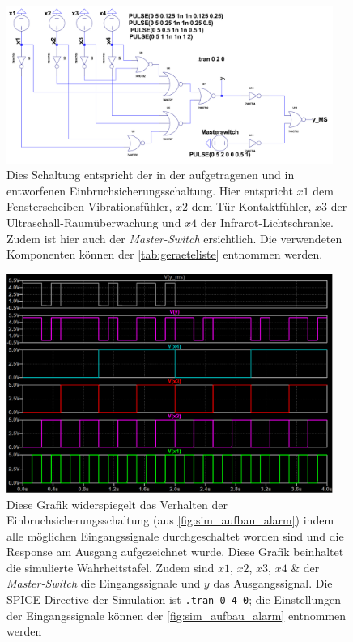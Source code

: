 \documentclass[12pt,english,ngerman]{scrartcl}
\begin{document}
\begin{figure}[H]
  \centering
    \includegraphics[width=0.95\textwidth]{./simdaten_lab/logic/schaltung.png}
    \caption{Dies Schaltung entspricht der in der
     aufgetragenen und in
   entworfenen Einbruchsicherungsschaltung. Hier
  entspricht $x1$ dem Fensterscheiben-Vibrationsfühler, $x2$ dem
  Tür-Kontaktfühler, $x3$ der Ultraschall-Raumüberwachung und $x4$ der
  Infrarot-Lichtschranke. Zudem ist hier auch der \textit{Master-Switch}
ersichtlich. Die verwendeten Komponenten können der \autoref{tab:geraeteliste}
entnommen werden.}
  \label{fig:sim_aufbau_alarm}
\end{figure}


\begin{figure}[H]
  \centering
    \includegraphics[width=0.95\textwidth]{./simdaten_lab/logic/master_verlauf.png}
  \caption{Diese Grafik widerspiegelt das Verhalten der
    Einbruchsicherungsschaltung (aus \autoref{fig:sim_aufbau_alarm}) indem alle
    möglichen Eingangssignale durchgeschaltet worden sind und die Response am
    Ausgang aufgezeichnet wurde. Diese Grafik beinhaltet die simulierte
    Wahrheitstafel. Zudem sind $x1$, $x2$, $x3$, $x4$ \&
    der \textit{Master-Switch} die Eingangssignale und $y$ das Ausgangssignal. Die
    SPICE-Directive der Simulation ist \texttt{.tran 0 4 0}; die
    Einstellungen der Eingangssignale können der \autoref{fig:sim_aufbau_alarm}
  entnommen werden}
  \label{fig:sim_alarm_wahrheit}
\end{figure}
\end{document}
